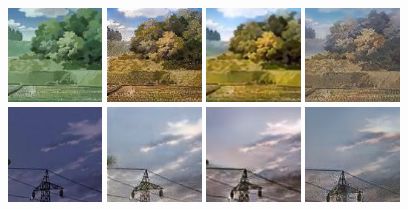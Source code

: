 \documentclass[runningheads]{llncs}
\begin{document}
\begin{figure}[!htb]
\centering     %
\subfigure
{\includegraphics[width=25mm]{pic/in_2.jpg}}
\subfigure
{\includegraphics[width=25mm]{pic/our_2.png}}
\subfigure
{\includegraphics[width=25mm]{pic/unit_2.jpg}}
\subfigure
{\includegraphics[width=25mm]{pic/sgan_2.jpg}}
\subfigure
{\includegraphics[width=25mm]{pic/in_5.jpg}}
\subfigure
{\includegraphics[width=25mm]{pic/our_5.png}}
\subfigure
{\includegraphics[width=25mm]{pic/unit_5.jpg}}
\subfigure
{\includegraphics[width=25mm]{pic/sgan_5.jpg}}

\end{figure}
\end{document}
